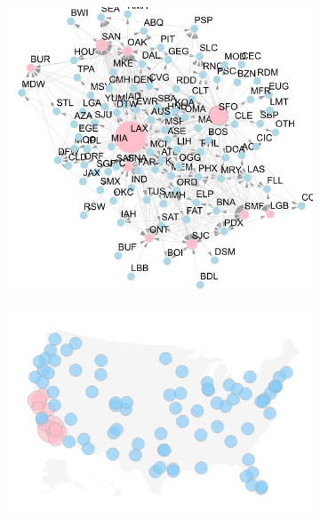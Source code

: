 \documentclass[12pt,a4paper]{article}
\begin{document}
\begin{figure}[H]
    \begin{subfigure}[b]{0.5\linewidth}
        \centering
        \includegraphics[width=\textwidth]{flight_net/cp_viz.png}
        \caption{}
        \label{fig:cp viz}
    \end{subfigure}
    \begin{subfigure}[b]{0.5\linewidth}
        \centering
        \includegraphics[width=\textwidth]{flight_net/map_coreness.png}
        \caption{}
        \label{fig:map cp}
    \end{subfigure}
    \caption{}
    \label{fig:cp viz main}
\end{figure}
\end{document}
